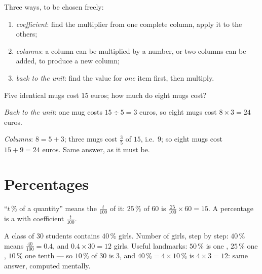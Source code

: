 \begin{method}\label{met:g6:propdata:complete}
Three ways, to be chosen freely:
\begin{enumerate}
  \item \emph{coefficient}: find the multiplier from one complete
        column, apply it to the others;
  \item \emph{columns}: a column can be multiplied by a number, or two
        columns can be added, to produce a new column;
  \item \emph{back to the unit}: find the value for \emph{one} item
        first, then multiply.
\end{enumerate}
\end{method}

\begin{example}\label{ex:g6:propdata:methods}
Five identical mugs cost $15$ euros; how much do eight mugs cost?

\emph{Back to the unit}: one mug costs $15 \div 5 = 3$ euros, so eight
mugs cost $8 \times 3 = 24$ euros.

\emph{Columns}: $8 = 5 + 3$; three mugs cost $\frac{3}{5}$ of $15$,
i.e.\ $9$; so eight mugs cost $15 + 9 = 24$ euros. Same answer, as it
must be.
\end{example}

\section{Percentages}

\begin{definition}[Percentage]\label{def:g6:propdata:percent}
``$t\,\%$ of a quantity'' means the  $\frac{t}{100}$ of it:
$25\,\%$ of $60$ is $\frac{25}{100} \times 60 = 15$. A percentage is a
 with coefficient $\frac{t}{100}$.
\end{definition}

\begin{example}\label{ex:g6:propdata:percent}
A class of $30$ students contains $40\,\%$ girls. Number of girls, step
by step: $40\,\%$ means $\frac{40}{100} = 0.4$, and
$0.4 \times 30 = 12$ girls. Useful landmarks:
$50\,\%$ is one , $25\,\%$ one , $10\,\%$ one tenth ---
so $10\,\%$ of $30$ is $3$, and $40\,\% = 4 \times 10\,\%$ is
$4 \times 3 = 12$: same answer, computed mentally.
\end{example}

